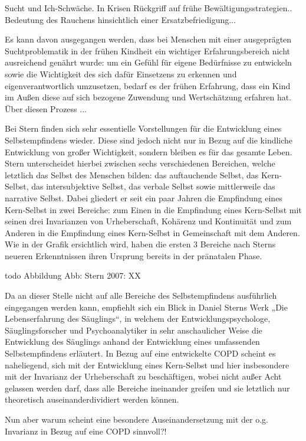 Sucht und Ich-Schwäche. In Krisen Rückgriff auf frühe Bewältigungsstrategien.. Bedeutung des Rauchens hinsichtlich einer Ersatzbefriedigung...

Es kann davon ausgegangen werden, dass bei Menschen mit einer ausgeprägten Suchtproblematik in der frühen Kindheit ein wichtiger Erfahrungsbereich nicht ausreichend genährt wurde: um ein Gefühl für eigene Bedürfnisse zu entwickeln sowie die Wichtigkeit des sich dafür Einsetzens zu erkennen und eigenverantwortlich umzusetzen, bedarf es der frühen Erfahrung, dass ein Kind im Außen diese auf sich bezogene Zuwendung und Wertschätzung erfahren hat. Über diesen Prozess ...

Bei Stern finden sich sehr essentielle Vorstellungen für die Entwicklung eines Selbstempfindens wieder. Diese sind jedoch nicht nur in Bezug auf die kindliche Entwicklung von großer Wichtigkeit, sondern bleiben es für das gesamte Leben. Stern unterscheidet hierbei zwischen sechs verschiedenen Bereichen, welche letztlich das Selbst des Menschen bilden: das auftauchende Selbst, das Kern-Selbst, das intersubjektive Selbst, das verbale Selbst sowie mittlerweile das narrative Selbst. Dabei gliedert er seit ein paar Jahren die Empfindung eines Kern-Selbst in zwei Bereiche: zum Einen in die Empfindung eines Kern-Selbst mit seinen drei Invarianzen von Urheberschaft, Kohärenz und Kontinuität und zum Anderen in die Empfindung eines Kern-Selbst in Gemeinschaft mit dem Anderen.  Wie in der Grafik ersichtlich wird, haben die ersten 3 Bereiche nach Sterns neueren Erkenntnissen ihren Ursprung bereits in der pränatalen Phase.

todo Abbildung 
Abb: Stern 2007: XX

Da an dieser Stelle nicht auf alle Bereiche des Selbstempfindens ausführlich eingegangen werden kann, empfiehlt sich ein Blick in Daniel Sterns Werk „Die Lebenserfahrung des Säuglings“, in welchem der Entwicklungspsychologe, Säuglingsforscher und Psychoanalytiker in sehr anschaulicher Weise die Entwicklung des Säuglings anhand der Entwicklung eines umfassenden Selbstempfindens erläutert.
In Bezug auf eine entwickelte COPD scheint es naheliegend, sich mit der Entwicklung eines Kern-Selbst und hier insbesondere mit der Invarianz der Urheberschaft zu beschäftigen, wobei nicht außer Acht gelassen werden darf, dass alle Bereiche ineinander greifen und sie letztlich nur theoretisch auseinanderdividiert werden können.

Nun aber warum scheint eine besondere Auseinandersetzung mit der o.g. Invarianz in Bezug auf eine COPD sinnvoll?!

